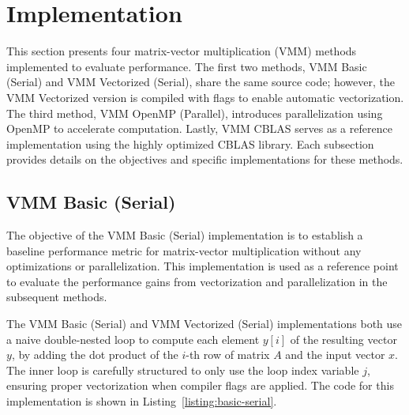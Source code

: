 
\section{Implementation}
\label{sec:implementation}


This section presents four matrix-vector multiplication (VMM) methods implemented to evaluate performance. The first two methods, VMM Basic (Serial) and VMM Vectorized (Serial), share the same source code; however, the VMM Vectorized version is compiled with flags to enable automatic vectorization. The third method, VMM OpenMP (Parallel), introduces parallelization using OpenMP to accelerate computation. Lastly, VMM CBLAS serves as a reference implementation using the highly optimized CBLAS library. Each subsection provides details on the objectives and specific implementations for these methods.



\subsection{VMM Basic (Serial)}
\label{subsec:vmm-basic-serial}


The objective of the VMM Basic (Serial) implementation is to establish a baseline performance metric for matrix-vector multiplication without any optimizations or parallelization. This implementation is used as a reference point to evaluate the performance gains from vectorization and parallelization in the subsequent methods.



The VMM Basic (Serial) and VMM Vectorized (Serial) implementations both use a naive double-nested loop to compute each element \(y[i]\) of the resulting vector \(y\), by adding the dot product of the \(i\)-th row of matrix \(A\) and the input vector \(x\). The inner loop is carefully structured to only use the loop index variable \(j\), ensuring proper vectorization when compiler flags are applied. The code for this implementation is shown in Listing~\ref{listing:basic-serial}.

